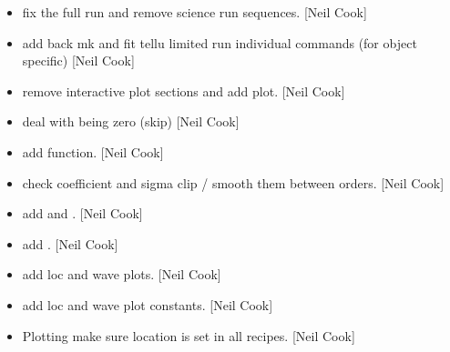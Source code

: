 \documentclass[a4paper,10pt,english]{report}
\begin{document}
\label{\detokenize{misc/changelog:id68}}\begin{itemize}
\item {} 
 \sphinxhyphen{} fix the full run and
remove science run sequences. {[}Neil Cook{]}

\item {} 
 \sphinxhyphen{} add back mk and fit
tellu limited run individual commands (for object specific) {[}Neil
Cook{]}

\item {} 
 \sphinxhyphen{} remove interactive plot sections and add
 plot. {[}Neil Cook{]}

\item {} 
 \sphinxhyphen{} deal with  being zero (skip) {[}Neil
Cook{]}

\item {} 
 \sphinxhyphen{} add  function. {[}Neil Cook{]}

\item {} 
 \sphinxhyphen{} check coefficient and sigma clip /
smooth them between orders. {[}Neil Cook{]}

\item {} 
 \sphinxhyphen{} add  and
. {[}Neil Cook{]}

\item {} 
 \sphinxhyphen{} add . {[}Neil Cook{]}

\item {} 
 \sphinxhyphen{} add loc and wave
plots. {[}Neil Cook{]}

\item {} 
 \sphinxhyphen{} add loc and wave plot
constants. {[}Neil Cook{]}

\item {} 
Plotting \sphinxhyphen{} make sure location is set in all recipes. {[}Neil Cook{]}

\end{itemize}
\end{document}
